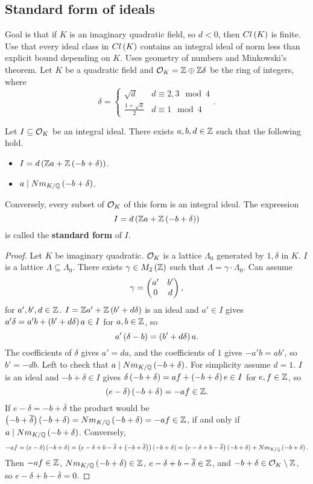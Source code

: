 \subsection{Standard form of ideals}

Goal is that if $ K $ is an imaginary quadratic field, so $ d < 0 $, then $ Cl\left( K \right) $ is finite. Use that every ideal class in $ Cl\left( K \right) $ contains an integral ideal of norm less than explicit bound depending on $ K $. Uses geometry of numbers and Minkowski's theorem. Let $ K $ be a quadratic field and $ \mathcal{O}_K = \mathbb{Z} \oplus \mathbb{Z}\delta $ be the ring of integers, where
$$ \delta =
\begin{cases}
\sqrt{d} & d \equiv 2, 3 \mod 4 \\
\tfrac{1 + \sqrt{d}}{2} & d \equiv 1 \mod 4
\end{cases}.
$$

\begin{proposition}
Let $ I \subseteq \mathcal{O}_K $ be an integral ideal. There exists $ a, b, d \in \mathbb{Z} $ such that the following hold.
\begin{itemize}
\item $ I = d\left( \mathbb{Z} a + \mathbb{Z}\left( -b + \delta \right) \right) $.
\item $ a \mid Nm_{K / \mathbb{Q}}\left( -b + \delta \right) $.
\end{itemize}
\end{proposition}

Conversely, every subset of $ \mathcal{O}_K $ of this form is an integral ideal. The expression
$$ I = d\left( \mathbb{Z} a + \mathbb{Z}\left( -b + \delta \right) \right) $$
is called the \textbf{standard form} of $ I $.

\begin{proof}
Let $ K $ be imaginary quadratic. $ \mathcal{O}_K $ is a lattice $ \Lambda_0 $ generated by $ 1, \delta $ in $ K $. $ I $ is a lattice $ \Lambda \subseteq \Lambda_0 $. There exists $ \gamma \in M_2\left( \mathbb{Z} \right) $ such that $ \Lambda = \gamma \cdot \Lambda_0 $. Can assume
$$ \gamma = \begin{pmatrix} a' & b' \\ 0 & d \end{pmatrix}, $$
for $ a', b', d \in \mathbb{Z} $. $ I = \mathbb{Z} a' + \mathbb{Z}\left( b' + d\delta \right) $ is an ideal and $ a' \in I $ gives $ a'\delta = a'b + \left( b' + d\delta \right)a \in I $ for $ a, b \in \mathbb{Z} $, so
$$ a'\left( \delta - b \right) = \left( b' + d\delta \right)a. $$
The coefficients of $ \delta $ gives $ a' = da $, and the coefficients of $ 1 $ gives $ -a'b = ab' $, so $ b' = -db $. Left to check that $ a \mid Nm_{K / \mathbb{Q}}\left( -b + \delta \right) $. For simplicity assume $ d = 1 $. $ I $ is an ideal and $ -b + \delta \in I $ gives $ \delta\left( -b + \delta \right) = af + \left( -b + \delta \right)e \in I $ for $ e, f \in \mathbb{Z} $, so
$$ \left( e - \delta \right)\left( -b + \delta \right) = -af \in \mathbb{Z}. $$
If $ e - \delta = -b + \overline{\delta} $ the product would be $ \left( -b + \overline{\delta} \right)\left( -b + \delta \right) = Nm_{K / \mathbb{Q}}\left( -b + \delta \right) = -af \in \mathbb{Z} $, if and only if $ a \mid Nm_{K / \mathbb{Q}}\left( -b + \delta \right) $. Conversely,
$$ -af = \left( e - \delta \right)\left( -b + \delta \right) = \left( e - \delta + b - \overline{\delta} + \left( -b + \overline{\delta} \right) \right)\left( -b + \delta \right) = \left( e - \delta + b - \overline{\delta} \right)\left( -b + \delta \right) + Nm_{K / \mathbb{Q}}\left( -b + \delta \right). $$
Then $ -af \in \mathbb{Z} $, $ Nm_{K / \mathbb{Q}}\left( -b + \delta \right) \in \mathbb{Z} $, $ e - \delta + b - \overline{\delta} \in \mathbb{Z} $, and $ -b + \delta \in \mathcal{O}_K \setminus \mathbb{Z} $, so $ e - \delta + b - \overline{\delta} = 0 $.
\end{proof}

